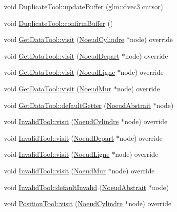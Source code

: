 \begin{DoxyCompactItemize}
\item 
void \hyperlink{group__inf2990_ga2fad36673e41afac22177ca37c6c75ff}{Duplicate\+Tool\+::update\+Buffer} (glm\+::dvec3 cursor)
\item 
void \hyperlink{group__inf2990_ga69fcbb20577c85049ca9a5ca8b37091d}{Duplicate\+Tool\+::confirm\+Buffer} ()
\item 
void \hyperlink{group__inf2990_ga21292ea905abc9e5c85d04e4ca9b6863}{Get\+Data\+Tool\+::visit} (\hyperlink{class_noeud_cylindre}{Noeud\+Cylindre} $\ast$node) override
\item 
void \hyperlink{group__inf2990_ga4ce08dbc70076e50ec519cd082a9e1ad}{Get\+Data\+Tool\+::visit} (\hyperlink{class_noeud_depart}{Noeud\+Depart} $\ast$node) override
\item 
void \hyperlink{group__inf2990_gadac537c2e9d4cf9b5d27695f497f7b1d}{Get\+Data\+Tool\+::visit} (\hyperlink{class_noeud_ligne}{Noeud\+Ligne} $\ast$node) override
\item 
void \hyperlink{group__inf2990_ga9db0192f32035edd1e4b8c2858feb5d1}{Get\+Data\+Tool\+::visit} (\hyperlink{class_noeud_mur}{Noeud\+Mur} $\ast$node) override
\item 
void \hyperlink{group__inf2990_gab96d72787632de185fd46dee5d8b9750}{Get\+Data\+Tool\+::default\+Getter} (\hyperlink{class_noeud_abstrait}{Noeud\+Abstrait} $\ast$node)
\item 
void \hyperlink{group__inf2990_ga55674ebdcf4c31ced5df732e2424d282}{Invalid\+Tool\+::visit} (\hyperlink{class_noeud_cylindre}{Noeud\+Cylindre} $\ast$node) override
\item 
void \hyperlink{group__inf2990_gabbc70a0da4b0aadac5a37f1fce30cb7a}{Invalid\+Tool\+::visit} (\hyperlink{class_noeud_depart}{Noeud\+Depart} $\ast$node) override
\item 
void \hyperlink{group__inf2990_gabc3528c6c0b4d009a2a0fa51493e517a}{Invalid\+Tool\+::visit} (\hyperlink{class_noeud_ligne}{Noeud\+Ligne} $\ast$node) override
\item 
void \hyperlink{group__inf2990_gab69a438cb8d2abff211cd450c9f946f5}{Invalid\+Tool\+::visit} (\hyperlink{class_noeud_mur}{Noeud\+Mur} $\ast$node) override
\item 
void \hyperlink{group__inf2990_gafb96baa12cb0df8c48c84dd12badd757}{Invalid\+Tool\+::default\+Invalid} (\hyperlink{class_noeud_abstrait}{Noeud\+Abstrait} $\ast$node)
\item 
void \hyperlink{group__inf2990_gac1643483872455c76ef059ac67ae6d04}{Position\+Tool\+::visit} (\hyperlink{class_noeud_cylindre}{Noeud\+Cylindre} $\ast$node) override

\end{DoxyCompactItemize}

